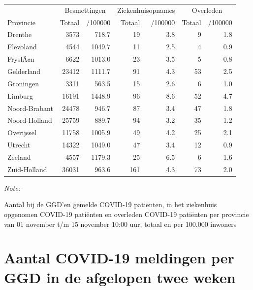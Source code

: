 \documentclass[
  english,
  man,floatsintext]{apa6}
\begin{document}
\begin{table}
\centering
\begin{threeparttable}
\begin{tabular}{lrrrrrr}
\toprule
\multicolumn{1}{c}{ } & \multicolumn{2}{c}{Besmettingen} & \multicolumn{2}{c}{Ziekenhuisopnames} & \multicolumn{2}{c}{Overleden} \\
\cmidrule(l{3pt}r{3pt}){2-3} \cmidrule(l{3pt}r{3pt}){4-5} \cmidrule(l{3pt}r{3pt}){6-7}
Provincie & Totaal & /100000 & Totaal & /100000 & Totaal & /100000\\
\midrule
Drenthe & 3573 & 718.7 & 19 & 3.8 & 9 & 1.8\\
Flevoland & 4544 & 1049.7 & 11 & 2.5 & 4 & 0.9\\
FryslÃ¢n & 6622 & 1013.0 & 23 & 3.5 & 5 & 0.8\\
Gelderland & 23412 & 1111.7 & 91 & 4.3 & 53 & 2.5\\
Groningen & 3311 & 563.5 & 15 & 2.6 & 6 & 1.0\\
Limburg & 16191 & 1448.9 & 96 & 8.6 & 52 & 4.7\\
Noord-Brabant & 24478 & 946.7 & 87 & 3.4 & 47 & 1.8\\
Noord-Holland & 25759 & 889.7 & 94 & 3.2 & 35 & 1.2\\
Overijssel & 11758 & 1005.9 & 49 & 4.2 & 25 & 2.1\\
Utrecht & 14322 & 1049.0 & 47 & 3.4 & 12 & 0.9\\
Zeeland & 4557 & 1179.3 & 25 & 6.5 & 6 & 1.6\\
Zuid-Holland & 36031 & 963.6 & 161 & 4.3 & 73 & 2.0\\
\bottomrule
\end{tabular}
\begin{tablenotes}
\item \textit{Note: } 
\item Aantal bij de GGD’en gemelde COVID-19 patiënten, in het ziekenhuis opgenomen COVID-19 patiënten en overleden COVID-19 patiënten per provincie van 01 november t/m 15 november 10:00 uur, totaal en per 100.000 inwoners
\end{tablenotes}
\end{threeparttable}
\end{table}

\newpage

\hypertarget{aantal-covid-19-meldingen-per-ggd-in-de-afgelopen-twee-weken}{%
\section{Aantal COVID-19 meldingen per GGD in de afgelopen twee weken}\label{aantal-covid-19-meldingen-per-ggd-in-de-afgelopen-twee-weken}}
\end{document}
